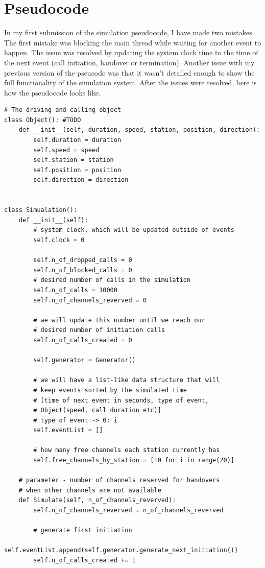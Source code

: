 \documentclass[12pt,a4paper]{article}
\begin{document}
\section{Pseudocode}
In my first submission of the simulation pseudocode, I have made two mistakes. The first mistake was blocking the main thread while waiting for another event to happen. The issue was resolved by updating the system clock time to the time of the next event (call initiation, handover or termination). Another issue with my previous version of the pseucode was that it wasn't detailed enough to show the full functionality of the simulation system. After the issues were resolved, here is how the pseudocode looks like.
\begin{lstlisting}
# The driving and calling object
class Object(): #TODO
    def __init__(self, duration, speed, station, position, direction):
        self.duration = duration
        self.speed = speed
        self.station = station
        self.position = position
        self.direction = direction


class Simualation():
    def __init__(self):
        # system clock, which will be updated outside of events
        self.clock = 0

        self.n_of_dropped_calls = 0
        self.n_of_blocked_calls = 0
        # desired number of calls in the simulation
        self.n_of_calls = 10000
        self.n_of_channels_reverved = 0

        # we will update this number until we reach our
        # desired number of initiation calls
        self.n_of_calls_created = 0

        self.generator = Generator()

        # we will have a list-like data structure that will
        # keep events sorted by the simulated time
        # [time of next event in seconds, type of event,
        # Object(speed, call duration etc)]
        # type of event -> 0: i
        self.eventList = []

        # how many free channels each station currently has
        self.free_channels_by_station = [10 for i in range(20)]

    # parameter - number of channels reserved for handovers
    # when other channels are not available
    def Simulate(self, n_of_channels_reverved):
        self.n_of_channels_reverved = n_of_channels_reverved

        # generate first initiation
        self.eventList.append(self.generator.generate_next_initiation())
        self.n_of_calls_created += 1


\end{lstlisting}
\end{document}
